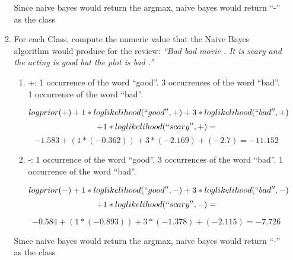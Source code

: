 \documentclass[11pt]{article}
\begin{document}
\begin{enumerate}
\begin{enumerate}
  Since naive bayes would return the argmax, naive bayes would return ``-'' as the class

 \item For each Class, compute the numeric value that the Naive Bayes algorithm would
  produce for the review: {\it ``Bad bad movie . It is scary and the
    acting is good but the plot is bad .''}
    
  \begin{enumerate}
  \item +: 1 occurrence of the word ``good''. 3 occurrences of the word ``bad''. 1 occurrence of the word ``bad''.
  
    $$logprior(+) + 1*loglikelihood(``good'', +) + 3 * loglikelihood(``bad'', +) $$
    $$+ 1 * loglikelihood(``scary'', +) =$$
    $$ -1.583 + (1 * (-0.362)) + 3 * (-2.169) + (-2.7) = -11.152$$
  
  \item -: 1 occurrence of the word ``good''. 3 occurrences of the word ``bad''. 1 occurrence of the word ``bad''.
  
    $$logprior(-) + 1*loglikelihood(``good'', -) + 3 * loglikelihood(``bad'', -) $$
    $$+ 1 * loglikelihood(``scary'', -) =$$
    
    $$ -0.584 + (1 * (-0.893)) + 3 * (-1.378) + (-2.115) = -7.726$$
  \end{enumerate}

  Since naive bayes would return the argmax, naive bayes would return ``-'' as the class


\end{enumerate}


\end{enumerate}
\end{document}
